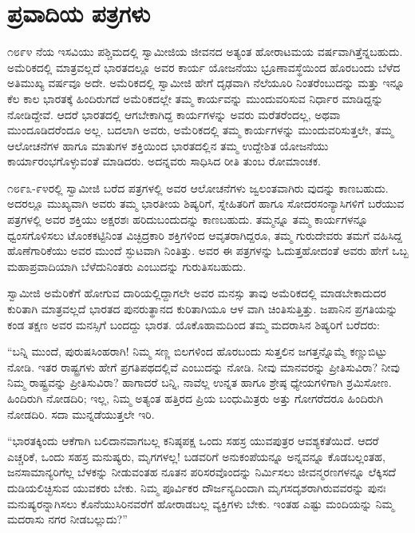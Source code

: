 
\chapter{ಪ್ರವಾದಿಯ ಪತ್ರಗಳು}

\noindent

೧೮೯೪ ನೆಯ ಇಸವಿಯು ಪಶ್ಚಿಮದಲ್ಲಿ ಸ್ವಾಮೀಜಿಯ ಜೀವನದ ಅತ್ಯಂತ ಹೋರಾಟಮಯ ವರ್ಷವಾಗಿತ್ತೆನ್ನಬಹುದು. ಅಮೆರಿಕದಲ್ಲಿ ಮಾತ್ರವಲ್ಲದೆ ಭಾರತದಲ್ಲೂ ಅವರ ಕಾರ್ಯ ಯೋಜನೆಯು ಭ್ರೂಣಾವಸ್ಥೆಯಿಂದ ಹೊರಬಂದು ಬೆಳೆದ ಅತಿಮುಖ್ಯ ವರ್ಷವೂ ಅದೇ. ಅಮೆರಿಕದಲ್ಲಿ ಸ್ವಾಮೀಜಿ ಹೇಗೆ ದೃಢವಾಗಿ ನೆಲೆಯೂರಿ ನಿಂತರೆಂಬುದನ್ನು ಮತ್ತು ಇನ್ನೂ ಕೆಲ ಕಾಲ ಭಾರತಕ್ಕೆ ಹಿಂದಿರುಗದೆ ಅಮೆರಿಕದಲ್ಲೇ ತಮ್ಮ ಕಾರ್ಯವನ್ನು ಮುಂದುವರಿಸುವ ನಿರ್ಧಾರ ಮಾಡಿದ್ದನ್ನು ನೋಡಿದ್ದೇವೆ. ಆದರೆ ಭಾರತದಲ್ಲಿ ಆಗಬೇಕಾಗಿದ್ದ ಕಾರ್ಯಗಳನ್ನು ಅವರು ಮರೆತರೆಂದಲ್ಲ, ಅಥವಾ ಮುಂದೂಡಿದರೆಂದೂ ಅಲ್ಲ. ಬದಲಾಗಿ ಅವರು, ಅಮೆರಿಕದಲ್ಲಿ ತಮ್ಮ ಕಾರ್ಯಗಳನ್ನು ಮುಂದುವರಿಸುತ್ತಲೇ, ತಮ್ಮ ಆಲೋಚನೆಗಳ ಹಾಗೂ ಮಾತುಗಳ ಶಕ್ತಿಯಿಂದ ಭಾರತದಲ್ಲಿನ ತಮ್ಮ ಉದ್ದೇಶಿತ ಯೋಜನೆಯು ಕಾರ್ಯಾರಂಭಗೊಳ್ಳುವಂತೆ ಮಾಡಿದರು. ಅದನ್ನವರು ಸಾಧಿಸಿದ ರೀತಿ ತುಂಬ ರೋಮಾಂಚಕ.

೧೮೯೩-೯೪ರಲ್ಲಿ ಸ್ವಾಮೀಜಿ ಬರೆದ ಪತ್ರಗಳಲ್ಲಿ ಅವರ ಆಲೋಚನೆಗಳು ಜ್ವಲಂತವಾಗಿರು ವುದನ್ನು ಕಾಣಬಹುದು. ಅದರಲ್ಲೂ ಮುಖ್ಯವಾಗಿ ಅವರು ತಮ್ಮ ಭಾರತೀಯ ಶಿಷ್ಯರಿಗೆ, ಸ್ನೇಹಿತರಿಗೆ ಹಾಗೂ ಸೋದರಸಂನ್ಯಾಸಿಗಳಿಗೆ ಬರೆಯುವ ಪತ್ರಗಳಲ್ಲಿ ಅವರ ಶಕ್ತಿಯು ಅಕ್ಷರಶಃ ಹರಿದುಬಂದುದನ್ನು ಕಾಣಬಹುದು. ತಮ್ಮನ್ನೂ ತಮ್ಮ ಕಾರ್ಯಗಳನ್ನೂ ಧ್ವಂಸಗೊಳಿಸಲು ಟೊಂಕಕಟ್ಟಿನಿಂತ ವಿಚ್ಛಿದ್ರಕಾರಿ ಶಕ್ತಿಗಳಿಂದ ಆವೃತರಾಗಿದ್ದರೂ, ತಮ್ಮ ಗುರುದೇವರು ತಮಗೆ ವಹಿಸಿದ್ದ ಹೊಣೆಗಾರಿಕೆಯು ಅವರ ಮುಂದೆ ಸ್ಫುಟವಾಗಿ ನಿಂತಿತ್ತು. ಅವರ ಈ ಪತ್ರಗಳನ್ನು ಓದುತ್ತಹೋದಂತೆ ಅವರು ಹೇಗೆ ಒಬ್ಬ ಮಹಾಪ್ರವಾದಿಯಾಗಿ ಬೆಳೆದುನಿಂತರು ಎಂಬುದನ್ನು ಗುರುತಿಸಬಹುದು.

ಸ್ವಾಮೀಜಿ ಅಮೆರಿಕೆಗೆ ಹೋಗುವ ದಾರಿಯಲ್ಲಿದ್ದಾಗಲೇ ಅವರ ಮನಸ್ಸು ತಾವು ಅಮೆರಿಕದಲ್ಲಿ ಮಾಡಬೇಕಾದುದರ ಕುರಿತಾಗಿ ಮಾತ್ರವಲ್ಲದೆ ಭಾರತದ ಪುನರುತ್ಥಾನದ ಕುರಿತಾಗಿಯೂ ಆಳ ವಾಗಿ ಚಿಂತಿಸುತ್ತಿತ್ತು. ಜಪಾನಿನ ಪ್ರಗತಿಯನ್ನು ಕಂಡ ತಕ್ಷಣ ಅವರ ಮನಸ್ಸಿಗೆ ಬಂದದ್ದು ಭಾರತ. ಯೊಕೊಹಾಮದಿಂದ ತಮ್ಮ ಮದರಾಸಿನ ಶಿಷ್ಯರಿಗೆ ಬರೆದರು:

“ಬನ್ನಿ ಮುಂದೆ, ಪುರುಷಸಿಂಹರಾಗಿ! ನಿಮ್ಮ ಸಣ್ಣ ಬಿಲಗಳಿಂದ ಹೊರಬಂದು ಸುತ್ತಲಿನ ಜಗತ್ತನ್ನೊಮ್ಮೆ ಕಣ್ಣುಬಿಟ್ಟು ನೋಡಿ. ಇತರ ರಾಷ್ಟ್ರಗಳು ಹೇಗೆ ಪ್ರಗತಿಪಥದಲ್ಲಿವೆ ಎಂಬುದನ್ನು ನೋಡಿ. ನೀವು ಮಾನವರನ್ನು ಪ್ರೀತಿಸುವಿರಾ? ನೀವು ನಿಮ್ಮ ರಾಷ್ಟ್ರವನ್ನು ಪ್ರೀತಿಸುವಿರಾ? ಹಾಗಾದರೆ ಬನ್ನಿ, ನಾವೆಲ್ಲ ಉನ್ನತ ಹಾಗೂ ಶ್ರೇಷ್ಠ ಧ್ಯೇಯಗಳಿಗಾಗಿ ಶ್ರಮಿಸೋಣ. ಹಿಂದಿರುಗಿ ನೋಡದಿರಿ; ಇಲ್ಲ, ನಿಮ್ಮ ಅತ್ಯಂತ ಹತ್ತಿರದ ಪ್ರಿಯ ಬಂಧುಮಿತ್ರರು ಅತ್ತು ಗೋಗರೆದರೂ ಹಿಂದಿರುಗಿ ನೋಡದಿರಿ. ಸದಾ ಮುನ್ನಡೆಯುತ್ತಲೇ ಇರಿ.

“ಭಾರತಕ್ಕಿಂದು ಆಕೆಗಾಗಿ ಬಲಿದಾನವಾಗಬಲ್ಲ ಕನಿಷ್ಠಪಕ್ಷ ಒಂದು ಸಹಸ್ರ ಯುವಪುತ್ರರ ಆವಶ್ಯಕತೆಯಿದೆ. ಆದರೆ ಎಚ್ಚರಿಕೆ, ಒಂದು ಸಹಸ್ರ ಮನುಷ್ಯರು, ಮೃಗಗಳಲ್ಲ! ಬಡವರಿಗೆ ಅನುಕಂಪೆಯನ್ನೂ ಅನ್ನವನ್ನೂ ಕೊಡಬಲ್ಲಂತಹ, ಜನಸಾಮಾನ್ಯರಿಗೆಲ್ಲ ಬೆಳಕನ್ನು ನೀಡುವಂತಹ ನೂತನ ಪರಿಸರವೊಂದನ್ನು ನಿರ್ಮಿಸಲು ಜೀವನ್ಮರಣಗಳನ್ನೂ ಲೆಕ್ಕಿಸದೆ ದುಡಿಯಲಿಚ್ಛಿಸುವ ಯುವಕರು ಬೇಕು. ನಿಮ್ಮ ಪೂರ್ವಿಕರ ದೌರ್ಜನ್ಯದಿಂದಾಗಿ ಮೃಗಸದೃಶರಾಗಿರುವವರನ್ನು ಪುನಃ ಮನುಷ್ಯರನ್ನಾಗಿಸಲು ಕೊನೆಯುಸಿರಿನವರೆಗೆ ಹೋರಾಡಬಲ್ಲ ವ್ಯಕ್ತಿಗಳು ಬೇಕು. ಇಂತಹ ಎಷ್ಟು ಮಂದಿಯನ್ನು ನಿಮ್ಮ ಮದರಾಸು ನಗರ ನೀಡಬಲ್ಲುದು?”

